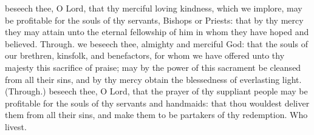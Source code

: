  beseech thee, O Lord, that thy merciful loving kindness, which we implore, may be profitable for the souls of thy servants, Bishops or Priests: that by thy mercy they may attain unto the eternal fellowship of him in whom they have hoped and believed. Through.
 we beseech thee, almighty and merciful God: that the souls of our brethren, kinsfolk, and benefactors, for whom we have offered unto thy majesty this sacrifice of praise; may by the power of this sacrament be cleansed from all their sins, and by thy mercy obtain the blessedness of everlasting light. (Through.)
 beseech thee, O Lord, that the prayer of thy suppliant people may be profitable for the souls of thy servants and handmaids: that thou wouldest deliver them from all their sins, and make them to be partakers of thy redemption. Who livest.